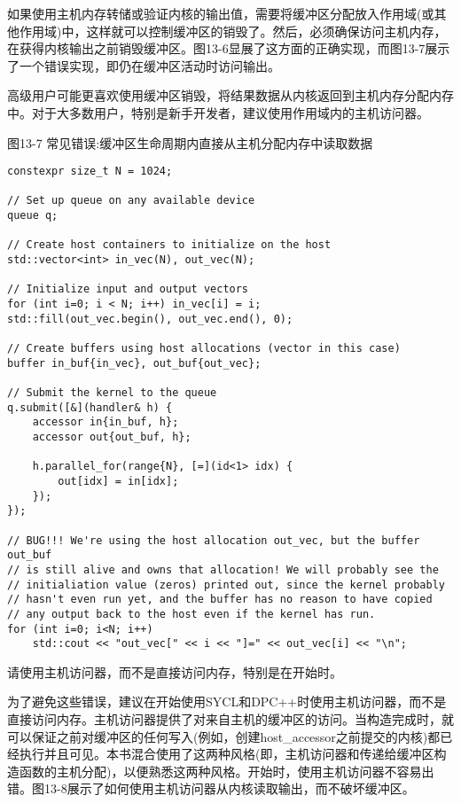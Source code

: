 如果使用主机内存转储或验证内核的输出值，需要将缓冲区分配放入作用域(或其他作用域)中，这样就可以控制缓冲区的销毁了。然后，必须确保访问主机内存，在获得内核输出之前销毁缓冲区。图13-6显展了这方面的正确实现，而图13-7展示了一个错误实现，即仍在缓冲区活动时访问输出。\par

\begin{tcolorbox}[colback=red!5!white,colframe=red!75!black]
高级用户可能更喜欢使用缓冲区销毁，将结果数据从内核返回到主机内存分配内存中。对于大多数用户，特别是新手开发者，建议使用作用域内的主机访问器。
\end{tcolorbox}

\hspace*{\fill} \par %
图13-7 常见错误:缓冲区生命周期内直接从主机分配内存中读取数据
\begin{lstlisting}[caption={}]
constexpr size_t N = 1024;

// Set up queue on any available device
queue q;

// Create host containers to initialize on the host
std::vector<int> in_vec(N), out_vec(N);

// Initialize input and output vectors
for (int i=0; i < N; i++) in_vec[i] = i;
std::fill(out_vec.begin(), out_vec.end(), 0);

// Create buffers using host allocations (vector in this case)
buffer in_buf{in_vec}, out_buf{out_vec};

// Submit the kernel to the queue
q.submit([&](handler& h) {
	accessor in{in_buf, h};
	accessor out{out_buf, h};
	
	h.parallel_for(range{N}, [=](id<1> idx) {
		out[idx] = in[idx];
	});
});

// BUG!!! We're using the host allocation out_vec, but the buffer out_buf
// is still alive and owns that allocation! We will probably see the
// initialiation value (zeros) printed out, since the kernel probably
// hasn't even run yet, and the buffer has no reason to have copied
// any output back to the host even if the kernel has run.
for (int i=0; i<N; i++)
	std::cout << "out_vec[" << i << "]=" << out_vec[i] << "\n";
\end{lstlisting}

\begin{tcolorbox}[colback=red!5!white,colframe=red!75!black]
请使用主机访问器，而不是直接访问内存，特别是在开始时。
\end{tcolorbox}

为了避免这些错误，建议在开始使用SYCL和DPC++时使用主机访问器，而不是直接访问内存。主机访问器提供了对来自主机的缓冲区的访问。当构造完成时，就可以保证之前对缓冲区的任何写入(例如，创建host\_accessor之前提交的内核)都已经执行并且可见。本书混合使用了这两种风格(即，主机访问器和传递给缓冲区构造函数的主机分配)，以便熟悉这两种风格。开始时，使用主机访问器不容易出错。图13-8展示了如何使用主机访问器从内核读取输出，而不破坏缓冲区。\par


